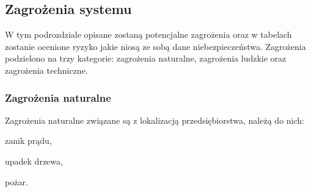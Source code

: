 \subsection{Zagrożenia systemu}
W tym podrozdziale opisane zostaną potencjalne zagrożenia oraz w tabelach zostanie ocenione ryzyko jakie niosą ze sobą dane niebezpieczeństwa. Zagrożenia podzielono na trzy kategorie: zagrożenia naturalne, zagrożenia ludzkie oraz zagrożenia techniczne.

\subsubsection{Zagrożenia naturalne} 
Zagrożenia naturalne związane są z lokalizacją przedsiębiorstwa, należą do nich:
\begin{itemize*}
	\item zanik prądu,
	\item upadek drzewa,
	\item pożar.
\end{itemize*}

